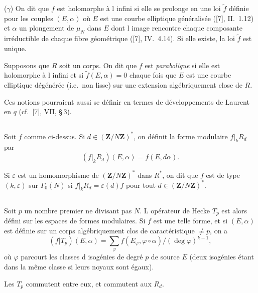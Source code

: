 \documentclass[11pt]{amsart}
\theoremstyle{plain}
\theoremstyle{definition}
\theoremstyle{remark}
\newcommand{\Z}{\mathbf{Z}}
\begin{document}
($\gamma$) On dit que $f$ est holomorphe à l infini si elle se prolonge en une loi $\tilde{f}$ définie pour les couples $(E, \alpha)$ où $E$ est une courbe elliptique généralisée ([7], II.~1.12) et $\alpha$ un plongement de $\mu_N$ dans $E$ dont l image rencontre chaque composante irréductible de chaque fibre géométrique ([7], IV.~4.14). Si elle existe, la loi $\tilde{f}$ est unique.

Supposons que $R$ soit un corps. On dit que $f$ est \emph{parabolique} si elle est holomorphe à l infini et si $\tilde{f}(E, \alpha) = 0$ chaque fois que $E$ est une courbe elliptique dégénérée (i.e.~non lisse) sur une extension algébriquement close de $R$.

Ces notions pourraient aussi se définir en termes de développements de Laurent en $q$ (cf.~[7], VII, \S\,3).

\subsection{}

Soit $f$ comme ci-dessus. Si $d \in (\Z/N\Z)^*$, on définit la forme modulaire $f|_k R_d$ par
\begin{equation}
\label{eq:rd}
(f|_k R_d)(E, \alpha) = f(E, d\alpha).
\end{equation}

Si $\varepsilon$ est un homomorphisme de $(\Z/N\Z)^*$ dans $R^*$, on dit que $f$ est de type $(k,\varepsilon)$ sur $\Gamma_0(N)$ si $f|_k R_d = \varepsilon(d) f$ pour tout $d \in (\Z/N\Z)^*$.

\subsection{}

Soit $p$ un nombre premier ne divisant pas $N$. L opérateur de Hecke $T_p$ est alors défini sur les espaces de formes modulaires. Si $f$ est une telle forme, et si $(E, \alpha)$ est définie sur un corps algébriquement clos de caractéristique $\ne p$, on a
$$
(f|T_p)(E, \alpha) = \sum_{\varphi} f(E_\varphi, \varphi \circ \alpha) / (\deg \varphi)^{k-1},
$$
où $\varphi$ parcourt les classes d isogénies de degré $p$ de source $E$ (deux isogénies étant dans la même classe si leurs noyaux sont égaux).

Les $T_p$ commutent entre eux, et commutent aux $R_d$.

\subsection{}
\end{document}
